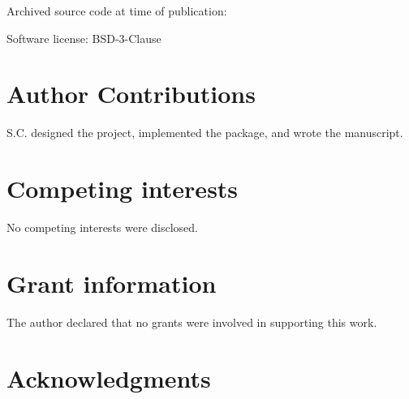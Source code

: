 \documentclass[9pt,a4paper]{extarticle}
\begin{document}
Archived source code at time of publication: 

Software license: BSD-3-Clause

\section*{Author Contributions}
S.C. designed the project, implemented the package, and wrote the manuscript.

\section*{Competing interests}
No competing interests were disclosed.

\section*{Grant information}
The author declared that no grants were involved in supporting this work.

\section*{Acknowledgments}
\begin{comment}
This section should acknowledge anyone who contributed to the research or the
article but who does not qualify as an author based on the criteria provided earlier
(e.g. someone or an organization that provided writing assistance). Please state how
they contributed; authors should obtain permission to acknowledge from all those
mentioned in the Acknowledgments section.

Please do not list grant funding in this section.
\end{comment}

{\small
}








\end{document}
